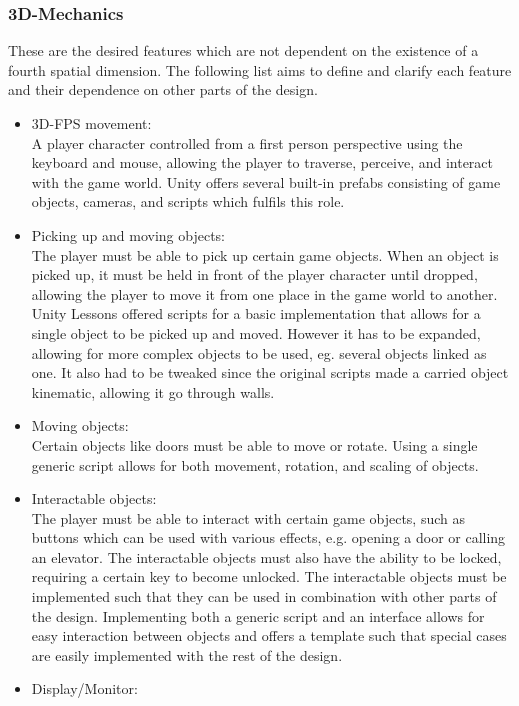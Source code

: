 \subsubsection{3D-Mechanics}
These are the desired features which are not dependent on the existence of a fourth spatial dimension. The following list aims to define and clarify each feature and their dependence on other parts of the design.
\begin{itemize}
	\item 3D-FPS movement:\\
	A player character controlled from a first person perspective using the keyboard and mouse, allowing the player to traverse, perceive, and interact with the game world. Unity offers several built-in prefabs consisting of game objects, cameras, and scripts which fulfils this role.
	\item Picking up and moving objects:\\
	The player must be able to pick up certain game objects. When an object is picked up, it must be held in front of the player character until dropped, allowing the player to move it from one place in the game world to another. Unity Lessons\cite{unityLessons} offered scripts for a basic implementation that allows for a single object to be picked up and moved. However it has to be expanded, allowing for more complex objects to be used, eg. several objects linked as one. It also had to be tweaked since the original scripts made a carried object kinematic, allowing it go through walls.  
	\item Moving objects:\\
	Certain objects like doors must be able to move or rotate. Using a single generic script allows for both movement, rotation, and scaling of objects. 
	\item Interactable objects:\\
	The player must be able to interact with certain game objects, such as buttons which can be used with various effects, e.g. opening a door or calling an elevator. The interactable objects must also have the ability to be locked, requiring a certain key to become unlocked. The interactable objects must be implemented such that they can be used in combination with other parts of the design. Implementing both a generic script and an interface allows for easy interaction between objects and offers a template such that special cases are easily implemented with the rest of the design.
	\item Display/Monitor:\\

\end{itemize}
